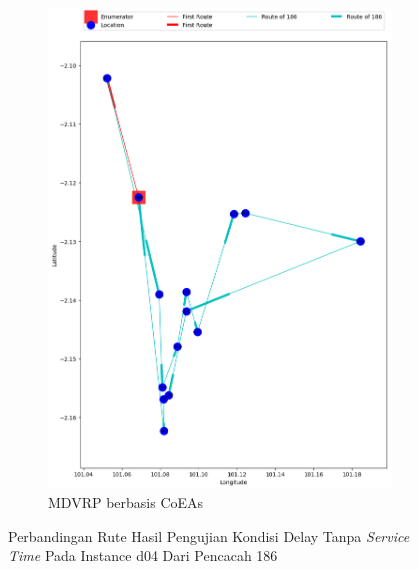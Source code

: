 \begin{figure}[H]
	\centering
	\begin{subfigure}[t]{\textwidth}
		\centering
		\includegraphics[width=\textwidth]{Resources/Images/delayed_5/real_m15_n100_delayed_5_186_coes}
		\caption{MDVRP berbasis CoEAs}
		\label{fig:real_m15_n100_delayed_5_186_coes}
	\end{subfigure}
	\caption{Perbandingan Rute Hasil Pengujian Kondisi Delay Tanpa \textit{Service Time} Pada Instance d04 Dari Pencacah 186}
	\label{fig:real_m15_n100_delayed_5_186}
\end{figure}


